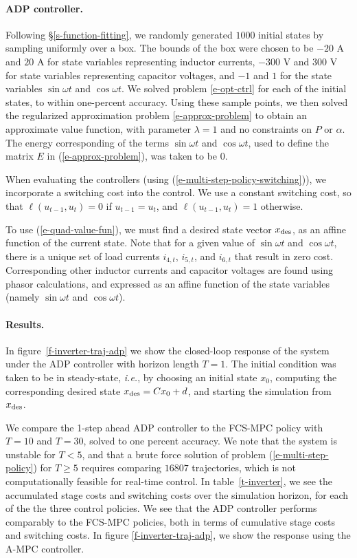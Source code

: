 \documentclass[12pt]{article}
\newcommand{\ie}{{\it i.e.}}
\begin{document}
\paragraph{ADP controller.}
Following \S\ref{s-function-fitting},
we randomly generated $1000$ initial states
by sampling uniformly over a box.
The bounds of the box were chosen to be 
$-20$ A and $20$ A for state variables representing inductor currents,
$-300$ V and $300$ V for state variables representing capacitor voltages,
and $-1$ and $1$ for the state variables $\sin \omega t$ and $\cos \omega t$.
We solved problem \eqref{e-opt-ctrl} for each of the initial states,
to within one-percent accuracy.
Using these sample points,
we then solved the regularized approximation problem 
\eqref{e-approx-problem}
to obtain an approximate value function,
with parameter $\lambda = 1$ and no constraints on $P$ or $\alpha$.
The energy corresponding of the terms 
$\sin \omega t$ and $\cos \omega t$,
used to define the matrix $E$ in (\ref{e-approx-problem}),
was taken to be $0$.

When evaluating the controllers 
(using (\ref{e-multi-step-policy-switching})),
we incorporate a switching cost into the control.
We use a constant switching cost,
so that $\ell(u_{t-1}, u_t) = 0$ if $u_{t-1} = u_t$,
and $\ell(u_{t-1}, u_t) = 1$ otherwise.

To use (\ref{e-quad-value-fun}),
we must find a desired state vector $x_{\rm des}$,
as an affine function of the current state.
Note that for a given value of $\sin\omega t$ and $\cos \omega t$,
there is a unique set of load currents 
$i_{4,t}$,
$i_{5,t}$,
and
$i_{6,t}$
that result in zero cost.
Corresponding other inductor currents and capacitor voltages
are found using phasor calculations,
and expressed as an affine function of the state variables
(namely $\sin \omega t$ and $\cos \omega t$).



\paragraph{Results.}
In figure~\ref{f-inverter-traj-adp}
we show the closed-loop response of the system
under the ADP controller with horizon length $T=1$.
The initial condition was taken to be in steady-state,
\ie, by choosing an initial state $x_0$,
computing the corresponding desired state 
$x_{\rm des} = Cx_0 + d$,
and starting the simulation from $x_{\rm des}$.

We compare the 1-step ahead ADP controller
to the FCS-MPC policy with $T = 10$ and $T = 30$,
solved to one percent accuracy.
We note that the system is unstable for $T < 5$,
and that a brute force solution of problem (\ref{e-multi-step-policy}) for $T \geq 5$
requires comparing $16807$ trajectories, 
which is not computationally feasible for real-time control.
In table~\ref{t-inverter}, 
we see the accumulated stage costs and switching costs over the simulation horizon,
for each of the the three control policies.
We see that the ADP controller performs comparably to the FCS-MPC policies,
both in terms of cumulative stage costs and switching costs.
In figure 
\ref{f-inverter-traj-adp},
we show the response using the A-MPC controller.
\end{document}

